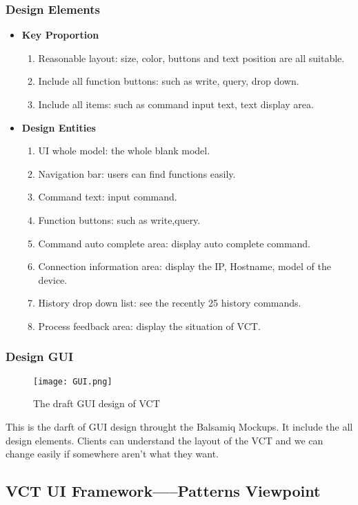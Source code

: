 \documentclass [10pt]{article}
\begin{document}
\subsubsection{Design Elements}
\begin{itemize}
\item \textbf{Key Proportion}
	\begin{enumerate}
	\item Reasonable layout: size, color, buttons and text position are all suitable.
    \item Include all function buttons: such as write, query, drop down.
    \item Include all items: such as command input text, text display area.    
    \end{enumerate}
\item \textbf{Design Entities}
	\begin{enumerate}
    \item UI whole model: the whole blank model.
	\item Navigation bar: users can find functions easily.
    \item Command text: input command.
    \item Function buttons: such as write,query.
    \item Command auto complete area: display auto complete command.
    \item Connection information area: display the IP, Hostname, model of the device.
    \item History drop down list: see the recently 25 history commands.
    \item Process feedback area: display the situation of VCT.
    \end{enumerate}
\end{itemize}
\subsubsection{Design GUI}
\begin{figure}[ht]
\centering
\texttt{[image: GUI.png]}
\caption{The draft GUI design of VCT}
\end{figure}
\newpage
This is the darft of GUI design throught the Balsamiq Mockups. It include the all design elements. Clients can understand the layout of the VCT and we can change easily if somewhere aren't what they want.

\subsection{VCT UI Framework-----Patterns Viewpoint}
\end{document}
